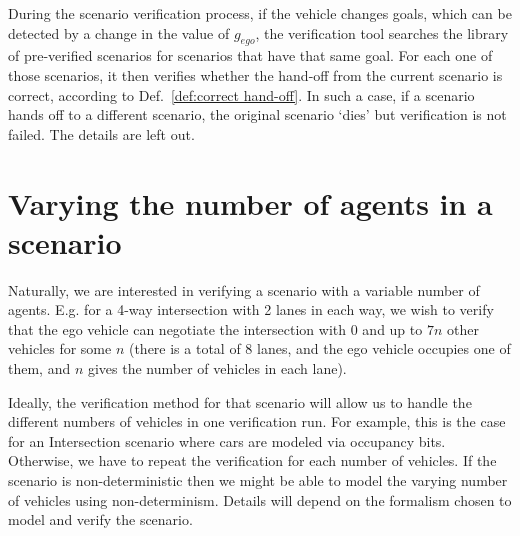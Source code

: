 During the scenario verification process, if the vehicle changes goals, which can be detected by a change in the value of $g_{ego}$, the verification tool searches the library of pre-verified scenarios for scenarios that have that same goal. 
For each one of those scenarios, it then verifies whether the hand-off from the current scenario is correct, according to Def.~\ref{def:correct hand-off}.
In such a case, if a scenario hands off to a different scenario, the original scenario `dies' but verification is not failed.
The details are left out.

\section{Varying the number of agents in a scenario}
\label{sec:varying nb agents}
Naturally, we are interested in verifying a scenario with a variable number of agents.
E.g. for a 4-way intersection with 2 lanes in each way, we wish to verify that the ego vehicle can negotiate the intersection with 0 and up to $7n$ other vehicles for some $n$ (there is a total of 8 lanes, and the ego vehicle occupies one of them, and $n$ gives the number of vehicles in each lane).

Ideally, the verification method for that scenario will allow us to handle the different numbers of vehicles in one verification run. 
For example, this is the case for an Intersection scenario where cars are modeled via occupancy bits.
Otherwise, we have to repeat the verification for each number of vehicles.
If the scenario is non-deterministic then we might be able to model the varying number of vehicles using non-determinism.
Details will depend on the formalism chosen to model and verify the scenario.



